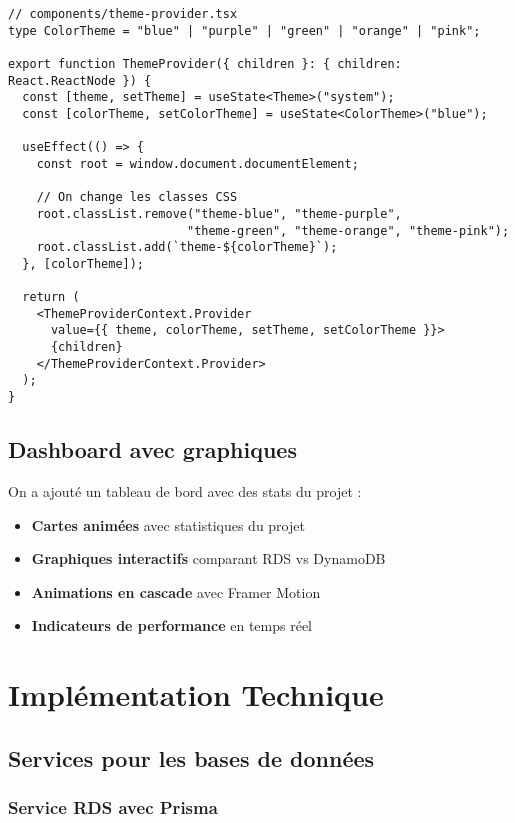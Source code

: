 \documentclass[12pt,a4paper]{report}
\begin{document}
\begin{lstlisting}[caption=Système de thèmes avec persistance]
// components/theme-provider.tsx
type ColorTheme = "blue" | "purple" | "green" | "orange" | "pink";

export function ThemeProvider({ children }: { children: React.ReactNode }) {
  const [theme, setTheme] = useState<Theme>("system");
  const [colorTheme, setColorTheme] = useState<ColorTheme>("blue");

  useEffect(() => {
    const root = window.document.documentElement;
    
    // On change les classes CSS
    root.classList.remove("theme-blue", "theme-purple", 
                         "theme-green", "theme-orange", "theme-pink");
    root.classList.add(`theme-${colorTheme}`);
  }, [colorTheme]);

  return (
    <ThemeProviderContext.Provider 
      value={{ theme, colorTheme, setTheme, setColorTheme }}>
      {children}
    </ThemeProviderContext.Provider>
  );
}
\end{lstlisting}

\section{Dashboard avec graphiques}

On a ajouté un tableau de bord avec des stats du projet :

\begin{itemize}
    \item \textbf{Cartes animées} avec statistiques du projet
    \item \textbf{Graphiques interactifs} comparant RDS vs DynamoDB
    \item \textbf{Animations en cascade} avec Framer Motion
    \item \textbf{Indicateurs de performance} en temps réel
\end{itemize}

\chapter{Implémentation Technique}

\section{Services pour les bases de données}

\subsection{Service RDS avec Prisma}
\end{document}
